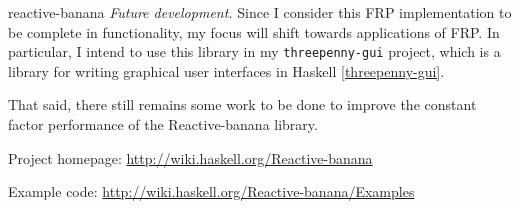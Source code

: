 \begin{hcarentry}{reactive-banana}
\emph{Future development.}
Since I consider this FRP implementation to be complete in functionality, my focus will shift towards applications of FRP. In particular, I intend to use this library in my \verb`threepenny-gui` project, which is a library for writing graphical user interfaces in Haskell \cref{threepenny-gui}.

That said, there still remains some work to be done to improve the constant factor performance of the Reactive-banana library.

\FurtherReading
\begin{compactitem}
\item Project homepage: \url{http://wiki.haskell.org/Reactive-banana}
\item Example code: \url{http://wiki.haskell.org/Reactive-banana/Examples}
\end{compactitem}
\end{hcarentry}
